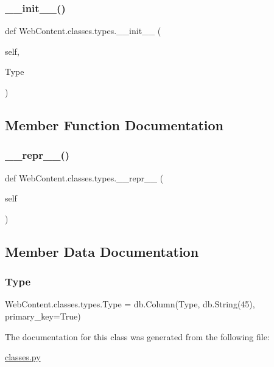 \subsubsection{\texorpdfstring{\+\_\+\+\_\+init\+\_\+\+\_\+()}{\_\_init\_\_()}}
{\footnotesize\ttfamily def Web\+Content.\+classes.\+types.\+\_\+\+\_\+init\+\_\+\+\_\+ (\begin{DoxyParamCaption}\item[{}]{self,  }\item[{}]{Type }\end{DoxyParamCaption})}



\subsection{Member Function Documentation}
\mbox{\label{class_web_content_1_1classes_1_1types_ad63c238527b3bf635f67442625dc976e}} 
\subsubsection{\texorpdfstring{\+\_\+\+\_\+repr\+\_\+\+\_\+()}{\_\_repr\_\_()}}
{\footnotesize\ttfamily def Web\+Content.\+classes.\+types.\+\_\+\+\_\+repr\+\_\+\+\_\+ (\begin{DoxyParamCaption}\item[{}]{self }\end{DoxyParamCaption})}



\subsection{Member Data Documentation}
\mbox{\label{class_web_content_1_1classes_1_1types_a14ba7df18201fb701b0408d06bc4c058}} 
\subsubsection{\texorpdfstring{Type}{Type}}
{\footnotesize\ttfamily Web\+Content.\+classes.\+types.\+Type = db.\+Column(\textquotesingle{}Type\textquotesingle{}, db.\+String(45), primary\+\_\+key=True)\hspace{0.3cm}{\ttfamily [static]}}



The documentation for this class was generated from the following file\+:\begin{DoxyCompactItemize}
\item 
\hyperlink{classes_8py}{classes.\+py}\end{DoxyCompactItemize}
